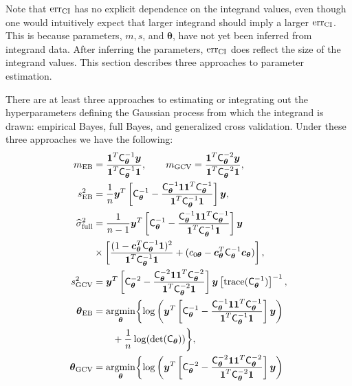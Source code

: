 \documentclass[twocolumn]{svjour3}          %
\newcommand{\bm}[1]{\boldsymbol{#1}}
\newcommand{\trace}[1]{\textup{trace}{#1}}
\newcommand{\vtheta}{{\bm{\theta}}}
\newcommand{\vc}{\bm{c}}
\newcommand{\vy}{\bm{y}}
\newcommand{\vone}{\bm{1}}
\newcommand{\mC}{\mathsf{C}}
\newcommand{\mCInv}{\mathsf{C}^{-1}}
\newcommand{\hsigma}{\widehat{\sigma}}
\newcommand{\MLE}{\textup{EB}}
\newcommand{\err}{\textup{err}}
\providecommand{\argmin}{\operatorname*{argmin}}
\begin{document}
Note that $\err_{\textup{CI}}$ has no explicit dependence on the integrand values, even though one would intuitively expect that larger integrand should imply a  larger $\err_{\textup{CI}}$.  This is because parameters, $m, s$, and $\vtheta$, have not yet been inferred from integrand data.  After inferring the parameters, $\err_{\textup{CI}}$ does reflect the size of the integrand values. This section describes three approaches to parameter estimation.

\begin{theorem} \label{thm:param} There are at least three approaches to estimating or integrating out the hyperparameters defining the Gaussian process from which the integrand is drawn: empirical Bayes, full Bayes, and generalized cross validation.  Under these three approaches we have the following:
\begin{align}
    \label{eqn_m_MLE}
m_\MLE &= \frac{\vone^T \mCInv_\vtheta \vy }{ \vone^T \mCInv_\vtheta \vone}, \qquad
m_{\textup{GCV}} = \frac{\vone^T \mC_\vtheta^{-2} \vy}{\vone^T \mC_\vtheta^{-2} \vone}, \\
\label{eqn_s2_MLE}
s^2_{\MLE} 
&= 
\frac{1}{n}
\vy^T 
\left[ \mCInv_\vtheta - 
\frac{ \mCInv_\vtheta \vone \vone^T \mCInv_\vtheta }{\vone^T\mCInv_\vtheta \vone}
\right] \vy, \\
\nonumber
\hsigma_{\textup{full}}^2 
& = \frac{1}{n-1}
\vy^T\left[ \mC_\vtheta^{-1} 
- \frac{ \mC_\vtheta^{-1} \vone\vone^T \mC_\vtheta^{-1}}{\vone^T \mC_\vtheta^{-1} \vone}  \right]\vy
\\ 
& \times  \left[\frac{(1 - \vc_{\vtheta}^T \mC_\vtheta^{-1} \vone)^2}{\vone^T \mC_\vtheta^{-1} \vone} + (c_{0\vtheta}  -\vc_{\vtheta} ^T \mC_\vtheta^{-1} \vc_{\vtheta}) \right], \\
\nonumber
 s^2_{\textup{GCV}} & = \vy^T \left[\mC_\vtheta^{-2} - \frac{\mC_\vtheta^{-2} \vone \vone^T \mC_\vtheta^{-2}}{\vone^T \mC_\vtheta^{-2} \vone}  \right] \vy  \left[ \trace(\mC_\vtheta^{-1}) \right]^{-1}, \\
\nonumber
\vtheta_\MLE
&= \argmin_{\vtheta} \biggl \{
\log\left(\vy^T 
\left[ \mC_\vtheta^{-1} - 
\frac{ \mCInv_\vtheta \vone \vone^T \mCInv_\vtheta }{\vone^T\mCInv_\vtheta \vone}
\right] \vy 
\right)  \\
\label{eqn:thetaMLE}
 & \qquad +  \frac{1}{n} \log(\det(\mC_\vtheta))
\biggr \}, \\
\nonumber
\vtheta_{\textup{GCV}} &= \argmin_\vtheta \biggl\{\log \left(  \vy^T \left[\mC^{-2}_\vtheta - \frac{\mC^{-2}_\vtheta \vone \vone^T \mC^{-2}_\vtheta}{\vone^T \mC^{-2}_\vtheta \vone}  \right] \vy \right)  \\

\end{align}
\end{theorem}
\end{document}
